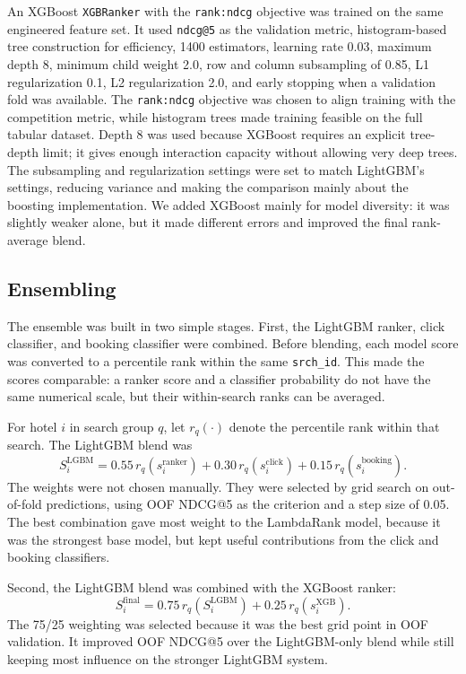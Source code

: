 \documentclass[runningheads]{llncs}
\begin{document}
An XGBoost \texttt{XGBRanker} with the \texttt{rank:ndcg} objective was trained on the same engineered feature set.  It used \texttt{ndcg@5} as the validation metric, histogram-based tree construction for efficiency, 1400 estimators, learning rate 0.03, maximum depth 8, minimum child weight 2.0, row and column subsampling of 0.85, L1 regularization 0.1, L2 regularization 2.0, and early stopping when a validation fold was available.  The \texttt{rank:ndcg} objective was chosen to align training with the competition metric, while histogram trees made training feasible on the full tabular dataset.  Depth 8 was used because XGBoost requires an explicit tree-depth limit; it gives enough interaction capacity without allowing very deep trees. The subsampling and regularization settings were set to match LightGBM’s settings, reducing variance and making the comparison mainly about the boosting implementation. We added XGBoost mainly for model diversity: it was slightly weaker alone, but it made different errors and improved the final rank-average blend.

\subsection{Ensembling}

The ensemble was built in two simple stages.  First, the LightGBM ranker, click classifier, and booking classifier were combined.  Before blending, each model score was converted to a percentile rank within the same \texttt{srch\_id}.  This made the scores comparable: a ranker score and a classifier probability do not have the same numerical scale, but their within-search ranks can be averaged.

For hotel $i$ in search group $q$, let $r_q(\cdot)$ denote the percentile rank within that search.  The LightGBM blend was
\[
S_i^{\mathrm{LGBM}}=
0.55\,r_q(s_i^{\mathrm{ranker}})
+0.30\,r_q(s_i^{\mathrm{click}})
+0.15\,r_q(s_i^{\mathrm{booking}}).
\]
The weights were not chosen manually.  They were selected by grid search on out-of-fold predictions, using OOF NDCG@5 as the criterion and a step size of 0.05.  The best combination gave most weight to the LambdaRank model, because it was the strongest base model, but kept useful contributions from the click and booking classifiers.

Second, the LightGBM blend was combined with the XGBoost ranker:
\[
S_i^{\mathrm{final}}=
0.75\,r_q(S_i^{\mathrm{LGBM}})
+0.25\,r_q(s_i^{\mathrm{XGB}}).
\]
The 75/25 weighting was selected because it was the best grid point in OOF validation.  It improved OOF NDCG@5 over the LightGBM-only blend while still keeping most influence on the stronger LightGBM system.
\end{document}
